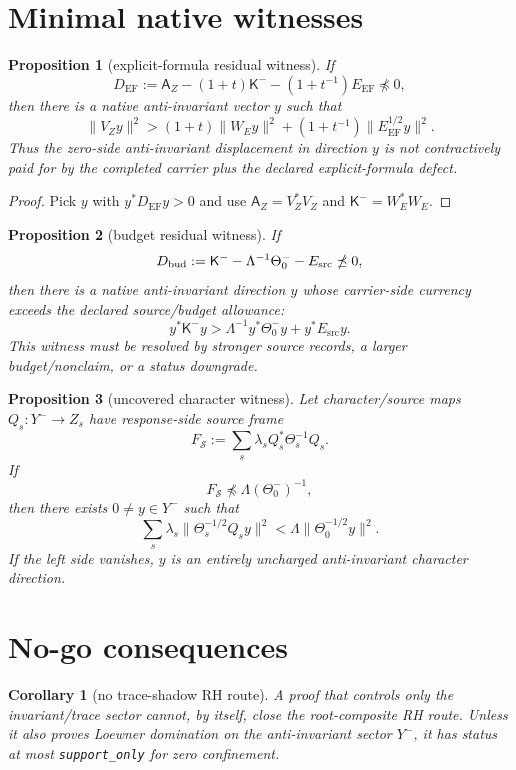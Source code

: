 \documentclass[11pt]{article}
\newtheorem{proposition}{Proposition}
\newtheorem{corollary}{Corollary}
\newcommand{\K}{\mathsf K}
\newcommand{\A}{\mathsf A}
\newcommand{\EF}{\mathrm{EF}}
\newcommand{\src}{\mathrm{src}}
\begin{document}
\section{Minimal native witnesses}

\begin{proposition}[explicit-formula residual witness]
If
\[
D_{\EF}:=\A_Z-(1+t)\K^--(1+t^{-1})E_{\EF}\npreceq0,
\]
then there is a native anti-invariant vector $y$ such that
\[
\|V_Zy\|^2>(1+t)\|W_Ey\|^2+(1+t^{-1})\|E_{\EF}^{1/2}y\|^2.
\]
Thus the zero-side anti-invariant displacement in direction $y$ is not contractively paid for by the completed carrier plus the declared explicit-formula defect.
\end{proposition}

\begin{proof}
Pick $y$ with $y^*D_{\EF}y>0$ and use $\A_Z=V_Z^*V_Z$ and $\K^-=W_E^*W_E$.
\end{proof}

\begin{proposition}[budget residual witness]
If
\[
D_{\rm bud}:=\K^- -\Lambda^{-1}\Theta_0^- -E_{\src}\npreceq0,
\]
then there is a native anti-invariant direction $y$ whose carrier-side currency exceeds the declared source/budget allowance:
\[
y^*\K^-y>\Lambda^{-1}y^*\Theta_0^-y+y^*E_{\src}y.
\]
This witness must be resolved by stronger source records, a larger budget/nonclaim, or a status downgrade.
\end{proposition}

\begin{proposition}[uncovered character witness]
Let character/source maps $Q_s:Y^-\to Z_s$ have response-side source frame
\[
F_{\mathcal S}:=\sum_s\lambda_s Q_s^*\Theta_s^{-1}Q_s.
\]
If
\[
F_{\mathcal S}\npreceq \Lambda(\Theta_0^-)^{-1},
\]
then there exists $0\ne y\in Y^-$ such that
\[
\sum_s\lambda_s\|\Theta_s^{-1/2}Q_sy\|^2<\Lambda\|\Theta_0^{-1/2}y\|^2.
\]
If the left side vanishes, $y$ is an entirely uncharged anti-invariant character direction.
\end{proposition}

\section{No-go consequences}

\begin{corollary}[no trace-shadow RH route]
A proof that controls only the invariant/trace sector cannot, by itself, close the root-composite RH route.  Unless it also proves Loewner domination on the anti-invariant sector $Y^-$, it has status at most \texttt{support\_only} for zero confinement.
\end{corollary}
\end{document}
